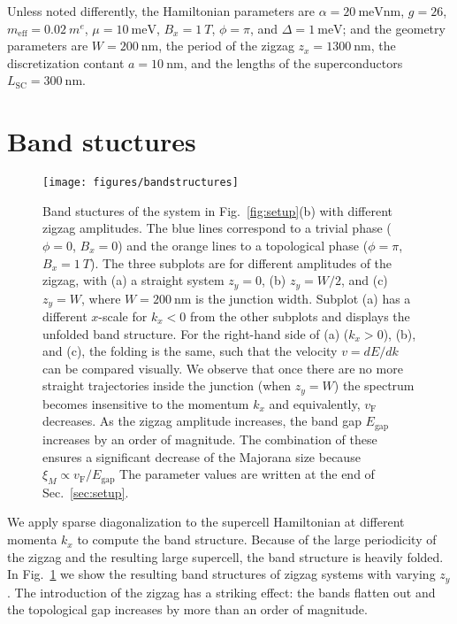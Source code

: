 \documentclass[english, twocolumn, 10pt, aps, superscriptaddress, floatfix, prb, citeautoscript]{revtex4-1}
\newcommand{\meff}{m_\text{eff}}
\renewcommand{\comment}[2]{#2}
\begin{document}
\comment{The default parameters are ...}
Unless noted differently, the Hamiltonian parameters are $\alpha=\SI{20}{\meV \nm}$, $g=26$, $\meff=\SI{0.02}{\electronmass}$, $\mu=\SI{10}{\meV}$, $B_x=\SI{1}{T}$, $\phi=\pi$, and $\Delta=\SI{1}{\meV}$; and the geometry parameters are $W=\SI{200}{\nm}$, the period of the zigzag $z_x=\SI{1300}{\nm}$, the discretization contant $a=\SI{10}{\nm}$, and the lengths of the superconductors $L_\textrm{SC}=\SI{300}{\nm}$.


\section{Band stuctures}\label{sec:band_structures}

\begin{figure}[!htb]
\texttt{[image: figures/bandstructures]}
\caption{Band stuctures of the system in Fig.~\ref{fig:setup}(b) with different zigzag amplitudes.
The blue lines correspond to a trivial phase ($\phi=0$, $B_x = 0$) and the orange lines to a topological phase ($\phi=\pi$, $B_x = \SI{1}{T}$).
The three subplots are for different amplitudes of the zigzag, with (a) a straight system $z_y=0$, (b) $z_y=W/2$, and (c) $z_y=W$, where $W=\SI{200}{\nm}$ is the junction width.
Subplot (a) has a different $x$-scale for $k_x < 0$ from the other subplots and displays the unfolded band structure.
For the right-hand side of (a) ($k_x > 0$), (b), and (c), the folding is the same, such that the velocity $v=dE/dk$ can be compared visually.
We observe that once there are no more straight trajectories inside the junction (when $z_y=W$) the spectrum becomes insensitive to the momentum $k_x$ and equivalently, $v_\textrm{F}$ decreases.
As the zigzag amplitude increases, the band gap $E_\textrm{gap}$ increases by an order of magnitude.
The combination of these ensures a significant decrease of the Majorana size because $\xi_M \propto v_\textrm{F}/E_\textrm{gap}$
The parameter values are written at the end of Sec.~\ref{sec:setup}.\label{fig:band_structures}}
\end{figure}

\comment{We calculate the band structure for varying amount of zigzag.}
We apply sparse diagonalization to the supercell Hamiltonian at different momenta $k_x$ to compute the band structure.
Because of the large periodicity of the zigzag and the resulting large supercell, the band structure is heavily folded.
In Fig.~\ref{fig:band_structures} we show the resulting band structures of zigzag systems with varying $z_y$.
The introduction of the zigzag has a striking effect: the bands flatten out and the topological gap increases by more than an order of magnitude.
\end{document}
